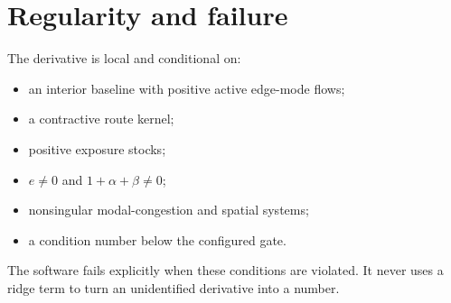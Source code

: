 
\section{Regularity and failure}

The derivative is local and conditional on:
\begin{itemize}
  \item an interior baseline with positive active edge-mode flows;
  \item a contractive route kernel;
  \item positive exposure stocks;
  \item \(e\neq0\) and \(1+\alpha+\beta\neq0\);
  \item nonsingular modal-congestion and spatial systems;
  \item a condition number below the configured gate.
\end{itemize}
The software fails explicitly when these conditions are violated. It never
uses a ridge term to turn an unidentified derivative into a number.

